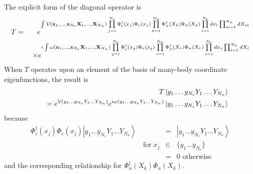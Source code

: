 The explicit form of the diagonal operator is 
\begin{eqnarray}
T &=&e^{\int {\cal V}({\bf x}_{1},\ldots ,{\bf x}_{N_{e}}{\bf X}_{1},\ldots ,%
{\bf X}_{N_{n}})\prod\limits_{j=1}^{N_{e}}\Phi _{e}^{\dagger }(x_{j})\Phi
_{e}(x_{j})\prod\limits_{k=1}^{N_{n}}\Phi _{n}^{\dagger }(X_{k})\Phi
_{n}(X_{k})\prod\limits_{l=1}^{N_{e}}dx_{l}\prod_{m=1}^{N_{n}}dX_{m}} 
\nonumber \\
&&\;\times e^{i\int \omega ({\bf x}_{1},\ldots ,{\bf x}_{N_{e}}{\bf X}%
_{1},\ldots ,{\bf X}_{N_{n}})\prod\limits_{q=1}^{N_{e}}\Phi _{e}^{\dagger
}(x_{q})\Phi _{e}(x_{q})\prod\limits_{r=1}^{N_{n}}\Phi _{n}^{\dagger
}(X_{r})\Phi
_{n}(X_{r})\prod\limits_{s=1}^{N_{e}}dx_{s}\prod_{t=1}^{N_{n}}dX_{t}}
\label{Tdexplicit}
\end{eqnarray}%
When $T$ operates upon an element of the basis of many-body coordinate
eigenfunctions, the result is 
\begin{eqnarray}
&&T\left| y_{1}\ldots y_{N_{e}}Y_{1}\ldots Y_{N_{n}}\right\rangle  \nonumber
\\
&&\quad =e^{{\cal V}(y_{1}\ldots y_{N_{e}}Y_{1}\ldots Y_{N_{n}})}e^{i\omega
(y_{1}\ldots y_{N_{e}}Y_{1}\ldots Y_{N_{n}})}\left| y_{1}\ldots
y_{N_{e}}Y_{1}\ldots Y_{N_{n}}\right\rangle  \label{Tdcoord}
\end{eqnarray}%
because 
\begin{eqnarray}
\Phi _{e}^{\dagger }(x_{j})\Phi _{e}(x_{j})\left| y_{1}\ldots
y_{N_{e}}Y_{1}\ldots Y_{N_{n}}\right\rangle &=&\left| y_{1}\ldots
y_{N_{e}}Y_{1}\ldots Y_{N_{n}}\right\rangle  \nonumber \\
\qquad \qquad \qquad \qquad \qquad \qquad \qquad \qquad \text{{for}}\;x_{j}
&\in &\{y_{1}\ldots y_{N_{e}}\}  \nonumber \\
&=&0\,\,\text{o{therwise}}
\end{eqnarray}%
and the corresponding relationship for $\Phi _{n}^{\dagger }(X_{k})\Phi
_{n}(X_{k})$.

